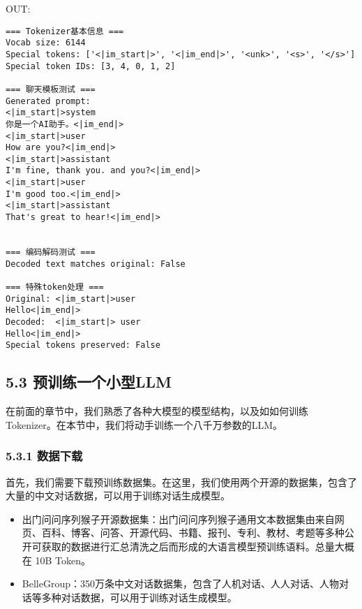 \documentclass[12pt,a4paper]{book}
\begin{document}
OUT:

\begin{verbatim}
=== Tokenizer基本信息 ===
Vocab size: 6144
Special tokens: ['<|im_start|>', '<|im_end|>', '<unk>', '<s>', '</s>']
Special token IDs: [3, 4, 0, 1, 2]

=== 聊天模板测试 ===
Generated prompt:
<|im_start|>system
你是一个AI助手。<|im_end|>
<|im_start|>user
How are you?<|im_end|>
<|im_start|>assistant
I'm fine, thank you. and you?<|im_end|>
<|im_start|>user
I'm good too.<|im_end|>
<|im_start|>assistant
That's great to hear!<|im_end|>


=== 编码解码测试 ===
Decoded text matches original: False

=== 特殊token处理 ===
Original: <|im_start|>user
Hello<|im_end|>
Decoded:  <|im_start|> user
Hello<|im_end|>
Special tokens preserved: False
\end{verbatim}

\subsection{5.3
预训练一个小型LLM}\label{ux9884ux8badux7ec3ux4e00ux4e2aux5c0fux578bllm}

在前面的章节中，我们熟悉了各种大模型的模型结构，以及如如何训练Tokenizer。在本节中，我们将动手训练一个八千万参数的LLM。

\subsubsection{5.3.1 数据下载}\label{ux6570ux636eux4e0bux8f7d}

首先，我们需要下载预训练数据集。在这里，我们使用两个开源的数据集，包含了大量的中文对话数据，可以用于训练对话生成模型。

\begin{itemize}
\item
  出门问问序列猴子开源数据集：出门问问序列猴子通用文本数据集由来自网页、百科、博客、问答、开源代码、书籍、报刊、专利、教材、考题等多种公开可获取的数据进行汇总清洗之后而形成的大语言模型预训练语料。总量大概在
  10B Token。
\item
  BelleGroup：350万条中文对话数据集，包含了人机对话、人人对话、人物对话等多种对话数据，可以用于训练对话生成模型。
\end{itemize}
\end{document}
